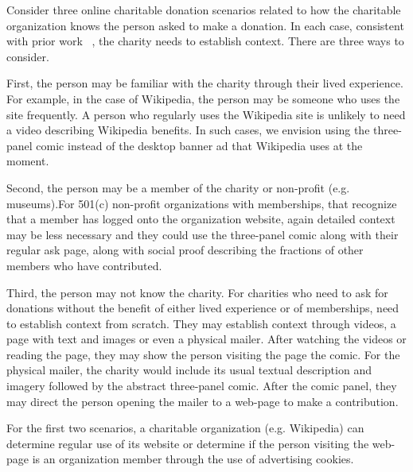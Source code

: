 \begin{description} [leftmargin=\parindent,topsep=0pt,partopsep=3pt,parsep=0pt,itemsep=3pt, listparindent=\parindent]
    \item[General Experimental Flow:] Consider three online charitable donation scenarios related to how the charitable organization knows the person asked to make a donation. In each case, consistent with prior work ~\cite{pessemier1977willingness}, the charity needs to establish context. There are three ways to consider.
    
    First, the person may be familiar with the charity through their lived experience. For example, in the case of Wikipedia, the person may be someone who uses the site frequently. A person who regularly uses the Wikipedia site is unlikely to need a video describing Wikipedia benefits. In such cases, we envision using the three-panel comic instead of the desktop banner ad that Wikipedia uses at the moment.
    
    Second, the person may be a member of the charity or non-profit (e.g. museums).For 501(c) non-profit organizations with memberships, that recognize that a member has logged onto the organization website, again detailed context may be less necessary and they could use the three-panel comic along with their regular ask page, along with social proof describing the fractions of other members who have contributed.
    
    Third, the person may not know the charity. For charities who need to ask for donations without the benefit of either lived experience or of memberships, need to establish context from scratch. They may establish context through videos, a page with text and images or even a physical mailer. After watching the videos or reading the page, they may show the person visiting the page the comic. For the physical mailer, the charity would include its usual textual description and imagery followed by the abstract three-panel comic. After the comic panel, they may direct the person opening the mailer to a web-page to make a contribution.
    
    For the first two scenarios, a charitable organization (e.g. Wikipedia) can determine regular use of its website or determine if the person visiting the web-page is an organization member through the use of advertising cookies.

    
    

\end{description}
